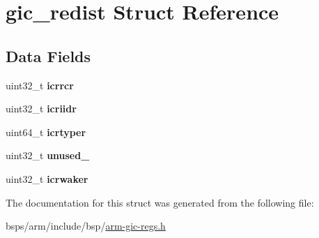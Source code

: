 \hypertarget{structgic__redist}{}\section{gic\+\_\+redist Struct Reference}
\label{structgic__redist}
\subsection*{Data Fields}
\begin{DoxyCompactItemize}
\item 
\mbox{\label{structgic__redist_a3839688edef6254b5ed9b66f3ec5b294}} 
uint32\+\_\+t {\bfseries icrrcr}
\item 
\mbox{\label{structgic__redist_a46d3bc148a48e91d28770aea61b29554}} 
uint32\+\_\+t {\bfseries icriidr}
\item 
\mbox{\label{structgic__redist_a00f02786d839d1e08b64b36f0fef64cb}} 
uint64\+\_\+t {\bfseries icrtyper}
\item 
\mbox{\label{structgic__redist_a6d2e05131eb4ac0032896e629439e14c}} 
uint32\+\_\+t {\bfseries unused\+\_}
\item 
\mbox{\label{structgic__redist_a9758748d58f1e9d343e03d7557ef8b79}} 
uint32\+\_\+t {\bfseries icrwaker}
\end{DoxyCompactItemize}


The documentation for this struct was generated from the following file\+:\begin{DoxyCompactItemize}
\item 
bsps/arm/include/bsp/\mbox{\hyperlink{arm-gic-regs_8h}{arm-\/gic-\/regs.\+h}}\end{DoxyCompactItemize}
